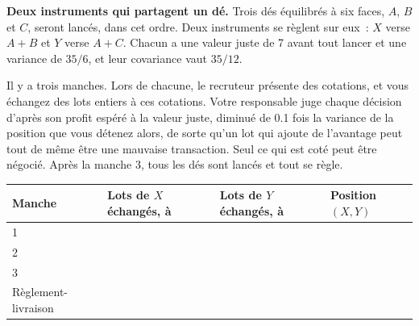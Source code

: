 \begin{question}\label{iq:iv2:played-games:6}
\textbf{Deux instruments qui partagent un dé.} Trois dés équilibrés à six faces, $A$, $B$ et $C$, seront lancés, dans cet ordre. Deux instruments se règlent sur eux~: $X$ verse $A + B$ et $Y$ verse $A + C$. Chacun a une valeur juste de 7 avant tout lancer et une variance de $35/6$, et leur covariance vaut $35/12$.

Il y a trois manches. Lors de chacune, le recruteur présente des cotations, et vous échangez des lots entiers à ces cotations. Votre responsable juge chaque décision d'après son profit espéré à la valeur juste, diminué de 0.1 fois la variance de la position que vous détenez alors, de sorte qu'un lot qui ajoute de l'avantage peut tout de même être une mauvaise transaction. Seul ce qui est coté peut être négocié. Après la manche 3, tous les dés sont lancés et tout se règle.

\medskip
\begin{tabular}{@{}l|l|l|l@{}}
Manche & Lots de $X$ échangés, à & Lots de $Y$ échangés, à & Position $(X, Y)$ \\ \hline
1 & & & \\[8pt]\hline
2 & & & \\[8pt]\hline
3 & & & \\[8pt]\hline
Règlement-livraison & & & \\[8pt]\hline
\end{tabular}
\end{question}
\vfill\clearpage

